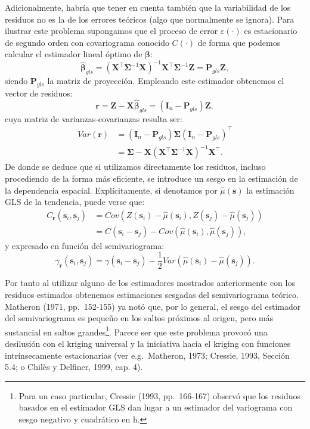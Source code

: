 \documentclass[
]{book}
\theoremstyle{break}
\theoremstyle{definition}
\theoremstyle{definition}
\theoremstyle{definition}
\theoremstyle{definition}
\theoremstyle{remark}
\begin{document}
Adicionalmente, habría que tener en cuenta también que la variabilidad de los residuos no es la de los errores teóricos (algo que normalmente se ignora).
Para ilustrar este problema supongamos que el proceso de error \(\varepsilon(\cdot)\) es estacionario de segundo orden con covariograma conocido \(C(\cdot)\) de forma que podemos calcular el estimador lineal óptimo de \(\boldsymbol{\beta}\):
\[\hat{\boldsymbol{\beta}}_{gls} =(\mathbf{X}^{\top}\boldsymbol{\Sigma}^{-1} \mathbf{X})^{-1} \mathbf{X}^{\top}\boldsymbol{\Sigma}^{-1} \mathbf{Z} = \mathbf{P}_{gls}\mathbf{Z},\]
siendo \(\mathbf{P}_{gls}\) la matriz de proyección.
Empleando este estimador obtenemos el vector de residuos:
\[\mathbf{r} =\mathbf{Z}-\mathbf{X}\hat{\boldsymbol{\beta}}_{gls} =\left( \mathbf{I}_{n} - \mathbf{P}_{gls} \right)\mathbf{Z},\]
cuya matriz de varianzas-covarianzas resulta ser:
\[\begin{aligned}
Var(\mathbf{r}) &=(\mathbf{I}_{n} -\mathbf{P}_{gls})\boldsymbol{\Sigma}(\mathbf{I}_{n}
-\mathbf{P}_{gls})^\top  \\
& = \boldsymbol{\Sigma} - \mathbf{X}(\mathbf{X}^\top\boldsymbol{\Sigma}^{-1} \mathbf{X})^{-1}
\mathbf{X}^\top.
\end{aligned}\]
De donde se deduce que si utilizamos directamente los residuos, incluso procediendo de la forma más eficiente, se introduce un sesgo en la estimación de la dependencia espacial.
Explícitamente, si denotamos por \(\hat{\mu}(\mathbf{s})\) la estimación GLS de la tendencia, puede verse que:
\[\begin{aligned}
C_{\mathbf{r}}(\mathbf{s}_{i} ,\mathbf{s}_{j}) &= Cov\left(Z(\mathbf{s}_{i})-\hat{\mu}(\mathbf{s}_{i}), Z(\mathbf{s}_{j} ) - \hat{\mu}(\mathbf{s}_{j})\right) \\
&= C(\mathbf{s}_{i} -\mathbf{s}_{j}) - Cov(\hat{\mu}(\mathbf{s}_{i} ), \hat{\mu}(\mathbf{s}_{j})),
\end{aligned}\]
y expresado en función del semivariograma:
\[\gamma_{\mathbf{r}}(\mathbf{s}_{i} ,\mathbf{s}_{j}) = \gamma
(\mathbf{s}_{i} -\mathbf{s}_{j})-\frac{1}{2} Var(\hat{\mu}
(\mathbf{s}_{i})-\hat{\mu}(\mathbf{s}_{j})).\]

Por tanto al utilizar alguno de los estimadores mostrados anteriormente con los residuos estimados obtenemos estimaciones sesgadas del semivariograma teórico.
Matheron (1971, pp.~152-155) ya notó que, por lo general, el sesgo del estimador del semivariograma es pequeño en los saltos próximos al origen, pero más sustancial en saltos grandes\footnote{Para un caso particular, Cressie (1993, pp.~166-167) observó que los residuos basados en el estimador GLS dan lugar a un estimador del variograma con sesgo negativo y cuadrático en h.}.
Parece ser que este problema provocó una desilusión con el kriging universal y la iniciativa hacia el kriging con funciones intrínsecamente estacionarias (ver e.g.~Matheron, 1973; Cressie, 1993, Sección 5.4; o Chilès y Delfiner, 1999, cap. 4).
\end{document}
